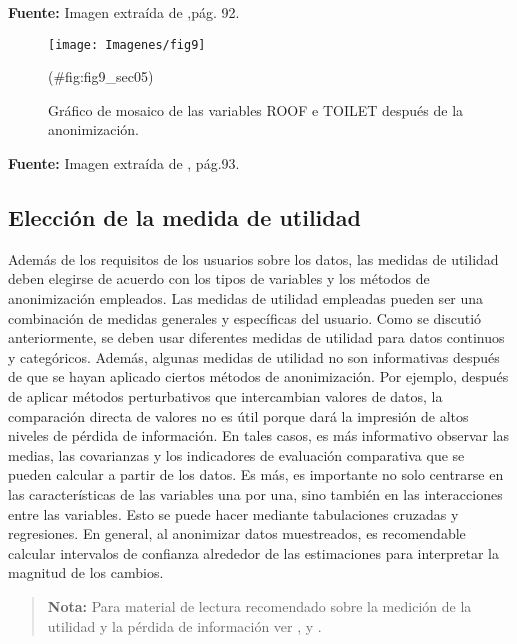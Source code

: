 \documentclass[
]{book}
\theoremstyle{definition}
\theoremstyle{definition}
\theoremstyle{definition}
\theoremstyle{definition}
\theoremstyle{remark}
\begin{document}
\textbf{Fuente:} Imagen extraída de \citep{benschop2021},pág. 92.

\begin{figure}

{\centering \texttt{[image: Imagenes/fig9]} 

}

\caption{Gráfico de mosaico de las variables ROOF e TOILET después de la anonimización.}(\#fig:fig9_sec05)
\end{figure}

\textbf{Fuente:} Imagen extraída de \citep{benschop2021}, pág.93.

\hypertarget{elecciuxf3n-de-la-medida-de-utilidad}{%
\subsection{Elección de la medida de utilidad}\label{elecciuxf3n-de-la-medida-de-utilidad}}

Además de los requisitos de los usuarios sobre los datos, las medidas de utilidad deben elegirse de acuerdo con los tipos de variables y los métodos de anonimización empleados. Las medidas de utilidad empleadas pueden ser una combinación de medidas generales y específicas del usuario. Como se discutió anteriormente, se deben usar diferentes medidas de utilidad para datos continuos y categóricos. Además, algunas medidas de utilidad no son informativas después de que se hayan aplicado ciertos métodos de anonimización. Por ejemplo, después de aplicar
métodos perturbativos que intercambian valores de datos, la comparación directa de valores no es útil porque dará la impresión de altos niveles de pérdida de información. En tales casos, es más informativo observar
las medias, las covarianzas y los indicadores de evaluación comparativa que se pueden calcular a partir de los datos. Es más, es importante no solo centrarse en las características de las variables una por una, sino
también en las interacciones entre las variables. Esto se puede hacer mediante tabulaciones cruzadas y regresiones. En general, al anonimizar datos muestreados, es recomendable calcular intervalos de confianza
alrededor de las estimaciones para interpretar la magnitud de los cambios.

\begin{quote}
\textbf{Nota:} Para material de lectura recomendado sobre la medición de la
utilidad y la pérdida de información ver \citep{dewaal1999}, \citep{domingo-ferrer2001} y \citep{domingo-ferrer2001}.
\end{quote}
\end{document}
